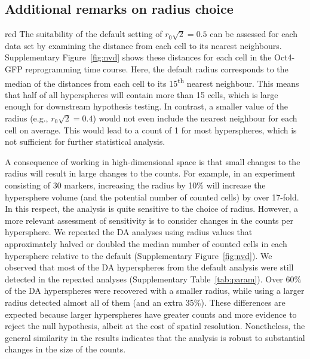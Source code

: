 \documentclass{article}
\begin{document}
\subsection{Additional remarks on radius choice}
\label{sec:additionalradius}

\begin{color}{red}
The suitability of the default setting of $r_0\sqrt{2}=0.5$ can be assessed for each data set by examining the distance from each cell to its nearest neighbours.
Supplementary Figure~\ref{fig:nvd} shows these distances for each cell in the Oct4-GFP reprogramming time course.
Here, the default radius corresponds to the median of the distances from each cell to its 15\textsuperscript{th} nearest neighbour.
This means that half of all hyperspheres will contain more than 15 cells, which is large enough for downstream hypothesis testing.
In contrast, a smaller value of the radius (e.g., $r_0\sqrt{2}=0.4$) would not even include the nearest neighbour for each cell on average.
This would lead to a count of 1 for most hyperspheres, which is not sufficient for further statistical analysis.


A consequence of working in high-dimensional space is that small changes to the radius will result in large changes to the counts.
For example, in an experiment consisting of 30 markers, increasing the radius by 10\% will increase the hypersphere volume (and the potential number of counted cells) by over 17-fold. 
In this respect, the analysis is quite sensitive to the choice of radius.
However, a more relevant assessment of sensitivity is to consider changes in the counts per hypersphere.
We repeated the DA analyses using radius values that approximately halved or doubled the median number of counted cells in each hypersphere relative to the default (Supplementary Figure~\ref{fig:nvd}).
We observed that most of the DA hyperspheres from the default analysis were still detected in the repeated analyses (Supplementary Table~\ref{tab:param}).
Over 60\% of the DA hyperspheres were recovered with a smaller radius, while using a larger radius detected almost all of them (and an extra 35\%).
These differences are expected because larger hyperspheres have greater counts and more evidence to reject the null hypothesis, albeit at the cost of spatial resolution.
Nonetheless, the general similarity in the results indicates that the analysis is robust to substantial changes in the size of the counts.
\end{color}
\end{document}
